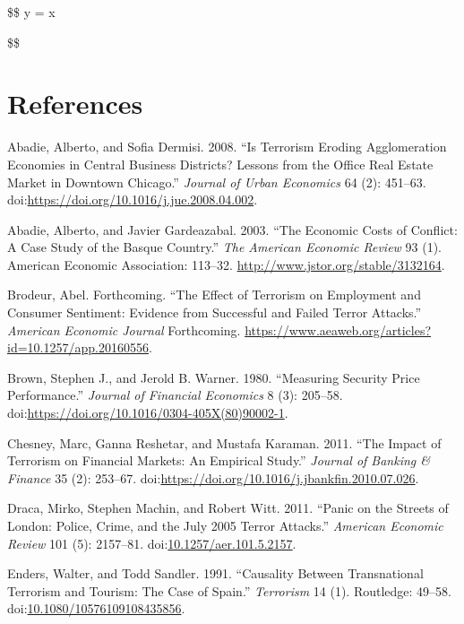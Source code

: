 \documentclass[]{AEA}
\begin{document}
\$\$ y = x

\$\$

\section{References}

\appendix

\hypertarget{refs}{}
\hypertarget{ref-ABADIE2008451}{}
Abadie, Alberto, and Sofia Dermisi. 2008. ``Is Terrorism Eroding
Agglomeration Economies in Central Business Districts? Lessons from the
Office Real Estate Market in Downtown Chicago.'' \emph{Journal of Urban
Economics} 64 (2): 451--63.
doi:\href{https://doi.org/https://doi.org/10.1016/j.jue.2008.04.002}{https://doi.org/10.1016/j.jue.2008.04.002}.

\hypertarget{ref-10.2307ux2f3132164}{}
Abadie, Alberto, and Javier Gardeazabal. 2003. ``The Economic Costs of
Conflict: A Case Study of the Basque Country.'' \emph{The American
Economic Review} 93 (1). American Economic Association: 113--32.
\url{http://www.jstor.org/stable/3132164}.

\hypertarget{ref-B_forthcoming}{}
Brodeur, Abel. Forthcoming. ``The Effect of Terrorism on Employment and
Consumer Sentiment: Evidence from Successful and Failed Terror
Attacks.'' \emph{American Economic Journal} Forthcoming.
\url{https://www.aeaweb.org/articles?id=10.1257/app.20160556}.

\hypertarget{ref-BROWN1980205}{}
Brown, Stephen J., and Jerold B. Warner. 1980. ``Measuring Security
Price Performance.'' \emph{Journal of Financial Economics} 8 (3):
205--58.
doi:\href{https://doi.org/https://doi.org/10.1016/0304-405X(80)90002-1}{https://doi.org/10.1016/0304-405X(80)90002-1}.

\hypertarget{ref-CHESNEY2011253}{}
Chesney, Marc, Ganna Reshetar, and Mustafa Karaman. 2011. ``The Impact
of Terrorism on Financial Markets: An Empirical Study.'' \emph{Journal
of Banking \& Finance} 35 (2): 253--67.
doi:\href{https://doi.org/https://doi.org/10.1016/j.jbankfin.2010.07.026}{https://doi.org/10.1016/j.jbankfin.2010.07.026}.

\hypertarget{ref-10.1257ux2faer.101.5.2157}{}
Draca, Mirko, Stephen Machin, and Robert Witt. 2011. ``Panic on the
Streets of London: Police, Crime, and the July 2005 Terror Attacks.''
\emph{American Economic Review} 101 (5): 2157--81.
doi:\href{https://doi.org/10.1257/aer.101.5.2157}{10.1257/aer.101.5.2157}.

\hypertarget{ref-doi:10.1080ux2f10576109108435856}{}
Enders, Walter, and Todd Sandler. 1991. ``Causality Between
Transnational Terrorism and Tourism: The Case of Spain.''
\emph{Terrorism} 14 (1). Routledge: 49--58.
doi:\href{https://doi.org/10.1080/10576109108435856}{10.1080/10576109108435856}.
\end{document}
